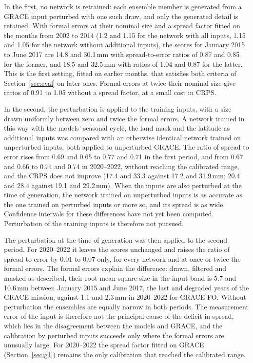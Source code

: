\documentclass[11pt,a4paper]{article}
\begin{document}
In the first, no network is retrained: each ensemble member is generated from a GRACE input
perturbed with one such draw, and only the generated detail is retained. With formal errors at
their nominal size and a spread factor fitted on the months from 2002 to 2014 (1.2 and 1.15
for the network with all inputs, 1.15 and 1.05 for the network without additional inputs), the
scores for January 2015 to June 2017 are 14.8 and 30.1\,mm with spread-to-error ratios of 0.87
and 0.85 for the former, and 18.5 and 32.5\,mm with ratios of 1.04 and 0.87 for the latter.
This is the first setting, fitted on earlier months, that satisfies both criteria of
Section~\ref{sec:eval} on later ones. Formal errors at twice their nominal size give ratios of
0.91 to 1.05 without a spread factor, at a small cost in CRPS.

In the second, the perturbation is applied to the training inputs, with a size drawn uniformly
between zero and twice the formal errors. A network trained in this way with the models'
seasonal cycle, the land mask and the latitude as additional inputs was compared with an
otherwise identical network trained on unperturbed inputs, both applied to unperturbed GRACE.
The ratio of spread to error rises from 0.69 and 0.65 to 0.77 and 0.71 in the first period,
and from 0.67 and 0.66 to 0.74 and 0.74 in 2020--2022, without reaching the calibrated range,
and the CRPS does not improve (17.4 and 33.3 against 17.2 and 31.9\,mm; 20.4 and 28.4 against
19.1 and 29.2\,mm). When the inputs are also perturbed at the time of generation, the network
trained on unperturbed inputs is as accurate as the one trained on perturbed inputs or more
so, and its spread is as wide. Confidence intervals for these differences have not yet been
computed. Perturbation of the training inputs is therefore not pursued.

The perturbation at the time of generation was then applied to the second period. For
2020--2022 it leaves the scores unchanged and raises the ratio of spread to error by 0.01 to
0.07 only, for every network and at once or twice the formal errors. The formal errors
explain the difference: drawn, filtered and masked as described, their root-mean-square size
in the input band is 5.7 and 10.6\,mm between January 2015 and June 2017, the last and
degraded years of the GRACE mission, against 1.1 and 2.3\,mm in 2020--2022 for GRACE-FO.
Without perturbation the ensembles are equally narrow in both periods. The measurement error
of the input is therefore not the principal cause of the deficit in spread, which lies in the
disagreement between the models and GRACE, and the calibration by perturbed inputs succeeds
only where the formal errors are unusually large. For 2020--2022 the spread factor fitted on
GRACE (Section~\ref{sec:g1}) remains the only calibration that reached the calibrated range.
\end{document}
